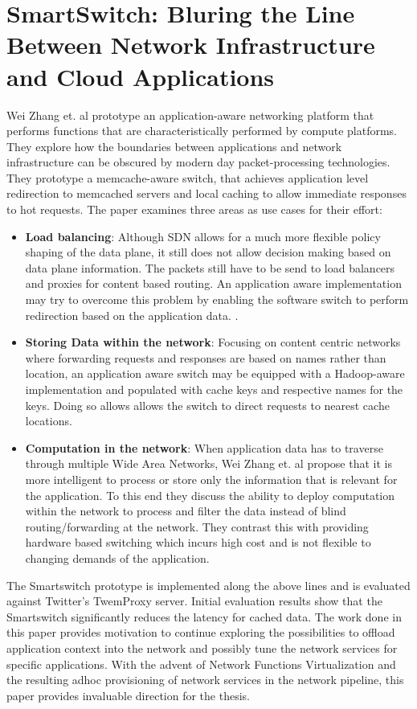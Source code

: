 \section{SmartSwitch: Bluring the Line Between Network Infrastructure and Cloud Applications}
Wei Zhang et. al \cite{zhang2014smartswitch} prototype an application-aware networking platform that performs functions that are characteristically performed by compute platforms. They explore how the boundaries between applications and network infrastructure can be obscured by modern day packet-processing technologies.  They prototype a memcache-aware switch, that achieves application level redirection to memcached servers and local caching to allow immediate responses to hot requests. The paper examines three areas as use cases for their effort:
\begin{itemize}

	\item  \textbf{Load balancing}: Although SDN allows for a much more flexible policy shaping of the data plane, it still does not allow decision making based on data plane information. The packets still have to be send to load balancers and proxies for content based routing. An application aware  implementation may try to overcome this problem by enabling the software switch to perform redirection based on the application data.
.
	\item  \textbf{Storing Data within the network}: Focusing on content centric networks where forwarding requests and responses are based on names rather than location, an application aware switch may be equipped with a Hadoop-aware implementation and populated with cache keys and respective names for the keys. Doing so allows allows the switch to direct requests to nearest cache locations.

	\item  \textbf{Computation in the network}: When application data has to traverse through multiple Wide Area Networks, Wei Zhang et. al propose that it is more intelligent to process or store only the information that is relevant for the application. To this end they discuss the ability to deploy computation within the network to process and filter the data instead of blind routing/forwarding at the network. They contrast this with providing hardware based switching which incurs high cost and is not flexible to changing demands of the application.

\end{itemize}
The Smartswitch prototype is implemented along the above lines and is evaluated against Twitter’s TwemProxy server. Initial evaluation results show that the Smartswitch significantly reduces the latency for cached data. The work done in this paper provides motivation to continue exploring the possibilities to offload application context into the network and possibly tune the network services for specific applications. With the advent of Network Functions Virtualization and the resulting adhoc provisioning of network services in the network pipeline, this paper provides invaluable direction for the thesis. 


